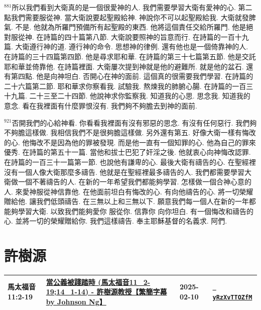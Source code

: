 \documentclass{book}
\begin{document}
$^{881}$所以我們看到大衛真的是一個很愛神的人.
我們需要學習大衛有愛神的心.
第二點我們需要服從神.
當大衛說要起聖殿給神.
神說你不可以起聖殿給我.
大衛就發脾氣.
不是.
他就為所羅門預備所有起聖殿的東西.
他將這個責任交給所羅門.
他是絕對服從神.
在詩篇的四十篇第八節.
大衛說要照神的旨意而行.
在詩篇的一百十九篇.
大衛遵行神的道.
遵行神的命令.
思想神的律例.
還有他也是一個倚靠神的人.
在詩篇的三十四篇第四節.
他是尋求耶和華.
在詩篇的第三十七篇第五節.
他是交託耶和華並倚靠他.
在詩篇裡面.
大衛屢次提到神就是他的避難所.
就是他的盆石.
還有第四點.
他是向神坦白.
否開心在神的面前.
這個真的很需要我們學習.
在詩篇的二十六篇第二節.
耶和華求你察看我.
試驗我.
熬煉我的肺腑心腸.
在詩篇的一百三十九篇.
二十三至二十四節.
他說神求你監察我.
知道我的心思.
思念我.
知道我的意念.
看在我裡面有什麼罪恨沒有.
我們夠不夠膽去到神的面前.

$^{921}$否開我們的心給神看.
你看看我裡面有沒有邪惡的思念.
有沒有任何惡行.
我們夠不夠膽這樣做.
我相信我們不是很夠膽這樣做.
另外還有第五.
好像大衛一樣有悔改的心.
他悔改不是因為他的罪被發現.
而是他一直有一個知罪的心.
他為自己的罪來優秀.
在詩篇的第五十一篇.
當他和拔士巴犯了奸淫之後.
他就衷心向神悔改認罪.
在詩篇的一百三十一篇第一節.
也說他有謙卑的心.
最後大衛有禱告的心.
在聖經裡沒有一個人像大衛那麼多禱告.
他就是在聖經裡最多禱告的人.
我們都需要學習大衛做一個不著禱告的人.
在新的一年希望我們都能夠學習.
怎樣做一個合神心意的人.
來愛神服從神信靠他.
在他面前坦白有悔改的心.
有向他禱告的心.
將一切榮耀贈給他.
讓我們低頭禱告.
在三無以上和三無以下.
願意我們每一個人在新的一年都能夠學習大衛.
以致我們能夠愛你 服從你.
信靠你 向你坦白.
有一個悔改和禱告的心.
並將一切的榮耀贈給你.
我們這樣禱告.
奉主耶穌基督的名義求.
阿們.
\newpage



\chapter{許樹源}\label{ch:preacher7}
\begin{multicols}{3}
\minitoc
\end{multicols}
{ \scriptsize


\begin{xltabular}{\textwidth}{|p{0.15\textwidth} p{0.6\textwidth}|p{0.07\textwidth} p{0.1\textwidth}|}
\hline
馬太福音 11:2-19 & \hyperref[sec:yRzXvTTOZfM]{當公義被踐踏時  (馬太福音11\_2-19;14\_1-14) - 許樹源教授【繁簡字幕 by Johnson Ng】} & 2025-02-10 & \href{https://youtube.com/watch?v=yRzXvTTOZfM}{\texttt{ yRzXvTTOZfM}} \\
\hline
\end{xltabular}
}
\newpage
\end{document}
